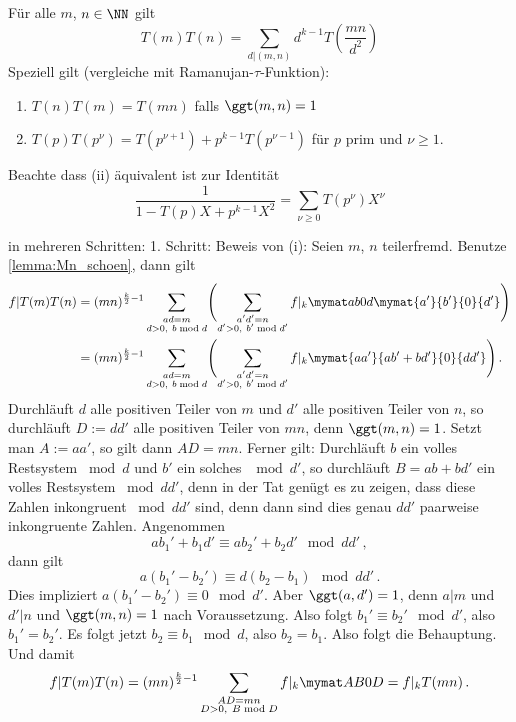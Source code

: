 \begin{satz}
Für alle $m$, $n \in \NN$ gilt
\[
	T(m) T(n) = \sum_{d | (m,n)} d^{k-1} T \left( \frac {mn}{d^2} \right)
\]
Speziell gilt (vergleiche mit Ramanujan-$\tau$-Funktion):
\begin{enumerate}
	\item $T(n)T(m) = T(mn)$ falls $\ggt(m,n) = 1$
	\item $T(p) T(p^\nu) = T(p^{\nu+1}) + p^{k-1} T(p^{\nu-1})$ für $p$ prim und $\nu \geq 1$.
\end{enumerate}

Beachte dass (ii) äquivalent ist zur Identität
\[
	\frac{1}{1-T(p)X+p^{k-1}X^2} = \sum_{\nu \geq 0} T(p^\nu) X^\nu
\]
\end{satz}

\begin{bewe}
	in mehreren Schritten:
	1. Schritt: Beweis von (i):
	Seien $m$, $n$ teilerfremd.
	Benutze \autoref{lemma:Mn_schoen}, dann gilt
	\begin{align*}
		f|T(m)T(n)
		&= (mn)^{\frac{k}{2}-1} \sum_{\substack{ad=m \vphantom{d'} \\ d>0,\ \vphantom{b'}b\bmod d}} \Biggl(\sum_{\substack{a'd' = n\\ d'>0,\ b' \bmod d'}} f|_k \mymat ab0d \mymat{a'}{b'}{0}{d'} \Biggr) \\
		&= (mn)^{\frac{k}{2}-1} \sum_{\substack{ad=m \vphantom{d'} \\ d>0,\ \vphantom{b'}b\bmod d}} \Biggl(\sum_{\substack{a'd' = n\\ d'>0,\ b' \bmod d'}} f|_k \mymat{aa'}{ab'+bd'}{0}{dd'} \Biggr)
		\,.
	\end{align*}
	Durchläuft $d$ alle positiven Teiler von $m$ und $d'$ alle positiven Teiler von $n$, so durchläuft $D := dd'$ alle positiven Teiler von $mn$, denn $\ggt(m, n) = 1$.
	Setzt man $A := aa'$, so gilt dann $AD = mn$.
	Ferner gilt: Durchläuft $b$ ein volles Restsystem $\bmod d$ und $b'$ ein solches $\mod d'$, so durchläuft $B = ab+bd'$ ein volles Restsystem $\bmod dd'$, denn in der Tat genügt es zu zeigen, dass diese Zahlen inkongruent $\bmod dd'$ sind, denn dann sind dies genau $dd'$ paarweise inkongruente Zahlen.
	Angenommen
	\[
		ab_1' + b_1d' \equiv ab_2' +b_2d' \mod dd'
		\,,
	\]
	dann gilt
	\[
		a(b_1' - b_2') \equiv d(b_2 - b_1) \mod dd'
		\,.
	\]
	Dies impliziert $a(b_1'- b_2') \equiv 0 \mod d'$. Aber $\ggt(a, d') = 1$, denn $a|m$ und $d'|n$ und $\ggt(m, n) = 1$ nach Voraussetzung.
	Also folgt $b_1' \equiv b_2' \mod d'$, also $b_1' = b_2'$.
	Es folgt jetzt $b_2 \equiv b_1 \mod d$, also $b_2 = b_1$.
	Also folgt die Behauptung.
	Und damit
	\[
		f|T(m)T(n)
		= (mn)^{\frac{k}{2}-1} \sum_{\substack{AD = mn\\ D > 0,\ B \bmod D}} f|_k \mymat AB0D
		= f|_kT(mn)
		\,.
	\]
	

\end{bewe}
